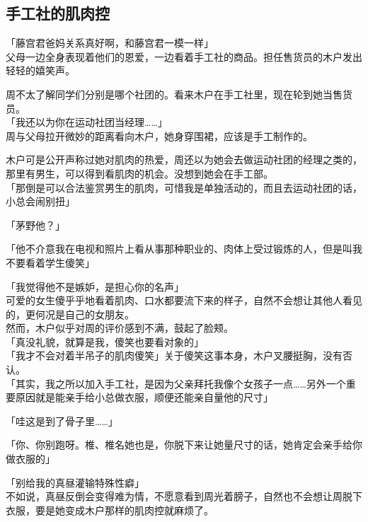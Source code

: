 \subsection{手工社的肌肉控}

「藤宫君爸妈关系真好啊，和藤宫君一模一样」\\

父母一边全身表现着他们的恩爱，一边看着手工社的商品。担任售货员的木户发出轻轻的嬉笑声。

周不太了解同学们分别是哪个社团的。看来木户在手工社里，现在轮到她当售货员。\\

「我还以为你在运动社团当经理……」\\

周与父母拉开微妙的距离看向木户，她身穿围裙，应该是手工制作的。

木户可是公开声称过她对肌肉的热爱，周还以为她会去做运动社团的经理之类的，那里有男生，可以得到看肌肉的机会。没想到她会在手工部。\\

「那倒是可以合法鉴赏男生的肌肉，可惜我是单独活动的，而且去运动社团的话，小总会闹别扭」

「茅野他？」

「他不介意我在电视和照片上看从事那种职业的、肉体上受过锻炼的人，但是叫我不要看着学生傻笑」

「我觉得他不是嫉妒，是担心你的名声」\\

可爱的女生傻乎乎地看着肌肉、口水都要流下来的样子，自然不会想让其他人看见的，更何况是自己的女朋友。\\

然而，木户似乎对周的评价感到不满，鼓起了脸颊。\\

「真没礼貌，就算是我，傻笑也要看对象的」\\

「我才不会对着半吊子的肌肉傻笑」关于傻笑这事本身，木户叉腰挺胸，没有否认。\\

「其实，我之所以加入手工社，是因为父亲拜托我像个女孩子一点……另外一个重要原因就是能亲手给小总做衣服，顺便还能亲自量他的尺寸」

「哇这是到了骨子里……」

「你、你别跑呀。椎、椎名她也是，你脱下来让她量尺寸的话，她肯定会亲手给你做衣服的」

「别给我的真昼灌输特殊性癖」\\

不如说，真昼反倒会变得难为情，不愿意看到周光着膀子，自然也不会想让周脱下衣服，要是她变成木户那样的肌肉控就麻烦了。\\

